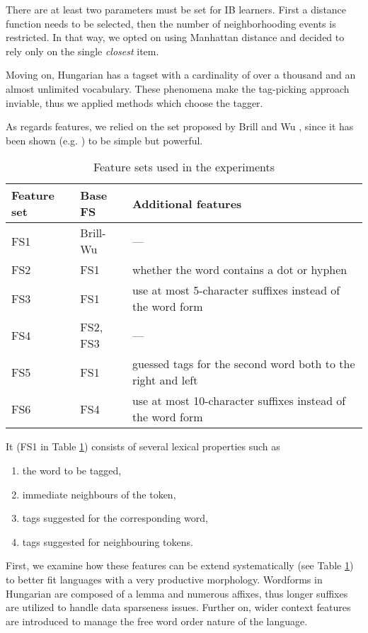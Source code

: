 There are at least two parameters must be set for IB learners.
First a distance function needs to be selected, then the number of neighborhooding events is restricted.
In that way, we opted on using Manhattan distance and decided to rely only on the single \emph{closest} item. 

Moving on, Hungarian has a tagset with a cardinality of over a thousand and an almost unlimited vocabulary.
These phenomena make the tag-picking approach inviable, thus we applied methods which choose the tagger. 

As regards features, we relied on the set proposed by Brill and Wu \cite{Brill1998}, since it has been shown (e.g. \cite{Halteren2001}) to be simple but powerful. 


\begin{table}[h]
\centering
\caption{Feature sets used in the experiments}\label{tab:comb-feature-sets}
\begin{tabular}{l l l}
\hline
Feature set & Base FS & Additional features \\
\hline
FS1 & Brill-Wu & --- \\
FS2 & FS1 & whether the word contains a dot or hyphen \\
FS3 & FS1 & use at most 5-character suffixes instead of the word form \\
FS4 & FS2, FS3 & --- \\ 
FS5 & FS1 & guessed tags for the second word both to the right and left \\
FS6 & FS4 & use at most 10-character suffixes instead of the word form \\
\hline
\end{tabular}
\end{table}


It (FS1 in Table \ref{tab:comb-feature-sets}) consists of several lexical properties such as
\begin{enumerate}
 \item the word to be tagged, 
 \item immediate neighbours of the token,
 \item tags suggested for the corresponding word,
 \item tags suggested for neighbouring tokens.
\end{enumerate}

First, we examine how these features can be extend systematically (see Table \ref{tab:comb-feature-sets}) to better fit languages with a very productive morphology.
Wordforms in Hungarian are composed of a lemma and numerous affixes, thus longer suffixes are utilized to handle data sparseness issues.
Further on, wider context features are introduced to manage the free word order nature of the language. 


